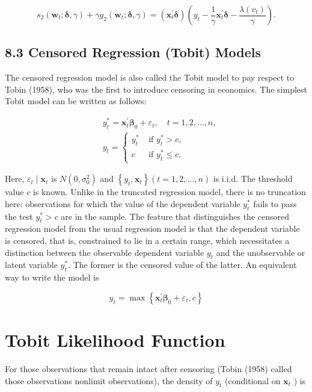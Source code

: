 \documentclass[10pt]{article}
\begin{document}
$$
s_{2}\left(\mathbf{w}_{t} ; \boldsymbol{\delta}, \gamma\right)+\gamma g_{2}\left(\mathbf{w}_{t} ; \boldsymbol{\delta}, \gamma\right)=\left(\mathbf{x}_{t}^{\prime} \boldsymbol{\delta}\right)\left(y_{t}-\frac{1}{\gamma} \mathbf{x}_{t}^{\prime} \boldsymbol{\delta}-\frac{\lambda\left(v_{t}\right)}{\gamma}\right) .
$$

\subsection*{8.3 Censored Regression (Tobit) Models}
The censored regression model is also called the Tobit model to pay respect to Tobin (1958), who was the first to introduce censoring in economics. The simplest Tobit model can be written as follows:


\begin{align*}
& y_{t}^{*}=\mathbf{x}_{t}^{\prime} \boldsymbol{\beta}_{0}+\varepsilon_{t}, \quad t=1,2, \ldots, n,  \tag{8.3.1}\\
& y_{t}=\left\{\begin{aligned}
y_{t}^{*} & \text { if } y_{t}^{*}>c, \\
c & \text { if } y_{t}^{*} \leq c .
\end{aligned}\right. \tag{8.3.2}
\end{align*}


Here, $\varepsilon_{t} \mid \mathbf{x}_{t}$ is $N\left(0, \sigma_{0}^{2}\right)$ and $\left\{y_{t}, \mathbf{x}_{t}\right\}(t=1,2, \ldots, n)$ is i.i.d. The threshold value $c$ is known. Unlike in the truncated regression model, there is no truncation here: observations for which the value of the dependent variable $y_{t}^{*}$ fails to pass the test $y_{t}^{*}>c$ are in the sample. The feature that distinguishes the censored regression model from the usual regression model is that the dependent variable is censored, that is, constrained to lie in a certain range, which necessitates a distinction between the observable dependent variable $y_{t}$ and the unobservable or latent variable $y_{t}^{*}$. The former is the censored value of the latter. An equivalent way to write the model is


\begin{equation*}
y_{t}=\max \left\{\mathbf{x}_{t}^{\prime} \boldsymbol{\beta}_{0}+\varepsilon_{t}, c\right\} \tag{8.3.3}
\end{equation*}


\section*{Tobit Likelihood Function}
For those observations that remain intact after censoring (Tobin (1958) called those observations nonlimit observations), the density of $y_{t}$ (conditional on $\mathbf{x}_{t}$ ) is
\end{document}
